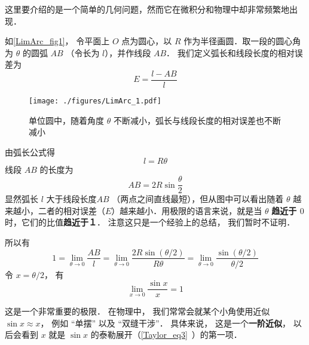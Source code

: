 

这里要介绍的是一个简单的几何问题，然而它在微积分和物理中却非常频繁地出现．

如\autoref{LimArc_fig1}， 令平面上 $O$ 点为圆心，以 $R$ 作为半径画圆．取一段的圆心角为 $\theta $ 的圆弧 $AB$ （令长为 $l$），并作线段 $AB$． 我们定义弧长和线段长度的相对误差为
\begin{equation}
E = \frac{l - AB}{l}
\end{equation}

\begin{figure}[ht]
\centering
\texttt{[image: ./figures/LimArc\_1.pdf]}
\caption{单位圆中，随着角度 $\theta$ 不断减小，弧长与线段长度的相对误差也不断减小}\label{LimArc_fig1}
\end{figure}

由弧长公式得
\begin{equation} \label{LimArc_eq1}
l = R\theta 
\end{equation}
线段 $AB$ 的长度为
\begin{equation}\label{LimArc_eq2}
AB = 2R\sin \frac{\theta }{2}
\end{equation}
显然弧长 $l$ 大于线段长度$AB$ （两点之间直线最短），但从图中可以看出随着 $\theta $ 越来越小，二者的相对误差（$E$）越来越小．用极限的语言来说，就是当 $\theta $ \textbf{趋近于 $0$ } 时，它们的比值\textbf{趋近于１}． 注意这只是一个经验上的总结， 我们暂时不证明．

所以有
\begin{equation}
1=\lim_{\theta\to 0} \frac{AB}{l} = \lim_{\theta\to 0} \frac{2R\sin (\theta/2)}{R\theta} 
= \lim_{\theta\to 0}\frac{\sin (\theta/2)}{\theta/2}
\end{equation}
令 $x = \theta/2$， 有
\begin{equation}
\lim_{x\to 0} \frac{\sin x}{x} = 1
\end{equation}

这是一个非常重要的极限． 在物理中， 我们常常会就某个小角使用近似 $\sin x \approx x$， 例如 “单摆” 以及 “双缝干涉”． 具体来说， 这是一个\textbf{一阶近似}，  以后会看到 $x$ 就是 $\sin x$ 的泰勒展开（\autoref{Taylor_eq3}~）的第一项．

